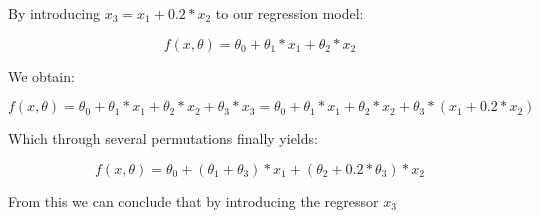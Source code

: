 \documentclass[12pt,a4paper]{article}
\begin{document}
By introducing $x_3 = x_1 + 0.2 * x_2$ to our regression model:

\begin{equation*}
	f(x,\theta) = \theta_0 + \theta_1 * x_1 + \theta_2 * x_2
\end{equation*}

We obtain:

\begin{equation*}
	f(x,\theta) = \theta_0 + \theta_1 * x_1 + \theta_2 * x_2 + \theta_3 * x_3
	=
	\theta_0 + \theta_1 * x_1 + \theta_2 * x_2 + \theta_3 * (x_1 + 0.2 * x_2)
\end{equation*}

Which through several permutations finally yields:

\begin{equation*}
	f(x,\theta) =
	\theta_0 + (\theta_1 + \theta_3) * x_1 + (\theta_2 + 0.2 * \theta_3) * x_2
\end{equation*}

From this we can conclude that by introducing the regressor $x_3$

\subsubsection{}

\subsubsection{}
\end{document}
